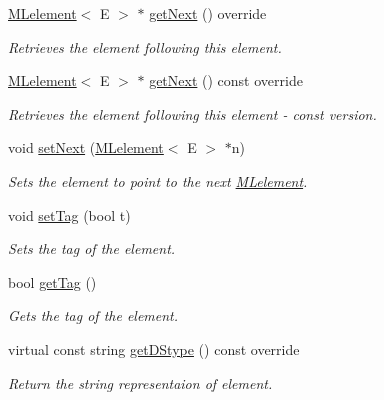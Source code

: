 \begin{DoxyCompactItemize}
\hyperlink{classbridges_1_1datastructure_1_1_m_lelement}{M\+Lelement}$<$ E $>$ $\ast$ \hyperlink{classbridges_1_1datastructure_1_1_m_lelement_a47b417db0b948b6899eece572bef9274}{get\+Next} () override
\begin{DoxyCompactList}\small\item\em Retrieves the element following this element. \end{DoxyCompactList}\item 
\hyperlink{classbridges_1_1datastructure_1_1_m_lelement}{M\+Lelement}$<$ E $>$ $\ast$ \hyperlink{classbridges_1_1datastructure_1_1_m_lelement_a611b3e7d54fdfbc622004a50ca718e6e}{get\+Next} () const override
\begin{DoxyCompactList}\small\item\em Retrieves the element following this element -\/ const version. \end{DoxyCompactList}\item 
void \hyperlink{classbridges_1_1datastructure_1_1_m_lelement_a13dfba9b3fa1af26c6d344fa7a086429}{set\+Next} (\hyperlink{classbridges_1_1datastructure_1_1_m_lelement}{M\+Lelement}$<$ E $>$ $\ast$n)
\begin{DoxyCompactList}\small\item\em Sets the element to point to the next \hyperlink{classbridges_1_1datastructure_1_1_m_lelement}{M\+Lelement}. \end{DoxyCompactList}\item 
void \hyperlink{classbridges_1_1datastructure_1_1_m_lelement_a32ba4ec57e6f5e1e65f82784a7f45804}{set\+Tag} (bool t)
\begin{DoxyCompactList}\small\item\em Sets the tag of the element. \end{DoxyCompactList}\item 
bool \hyperlink{classbridges_1_1datastructure_1_1_m_lelement_a44ef87048b6b0424478f498cf99149f2}{get\+Tag} ()
\begin{DoxyCompactList}\small\item\em Gets the tag of the element. \end{DoxyCompactList}\item 
virtual const string \hyperlink{classbridges_1_1datastructure_1_1_m_lelement_a735c3cb43648b4d4e7d3316cdc1a1952}{get\+D\+Stype} () const override
\begin{DoxyCompactList}\small\item\em Return the string representaion of element. \end{DoxyCompactList}\end{DoxyCompactItemize}
